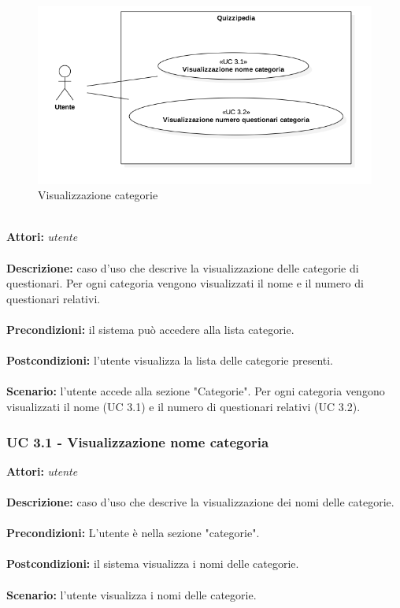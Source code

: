 \documentclass[a4paper,11pt]{article}
\begin{document}
\begin{figure}[h!]
\centering
\includegraphics[scale=0.6]{../immagini/UC3.png}
\caption{Visualizzazione categorie}
\end{figure}
\ \\
\textbf{Attori:} \textit{utente}
\\ \\
\textbf{Descrizione:} caso d'uso che descrive la visualizzazione delle categorie di questionari. Per ogni categoria vengono visualizzati il nome e il numero di questionari relativi.\\
\\
\textbf{Precondizioni:} il sistema può accedere alla lista categorie.\\
\\
\textbf{Postcondizioni:} l’utente visualizza la lista delle categorie presenti.\\
\\
\textbf{Scenario:} l’utente accede alla sezione "Categorie". Per ogni categoria vengono visualizzati il nome (UC 3.1) e il numero di questionari relativi (UC 3.2).\\


\subsubsection{UC 3.1 - Visualizzazione nome categoria}

\textbf{Attori:} \textit{utente}
\\ \\
\textbf{Descrizione:} caso d'uso che descrive la visualizzazione dei nomi delle categorie.\\
\\
\textbf{Precondizioni:} L'utente è nella sezione "categorie".\\
\\
\textbf{Postcondizioni:} il sistema visualizza i nomi delle categorie.\\
\\
\textbf{Scenario:} l’utente visualizza i nomi delle categorie.\\
\end{document}
